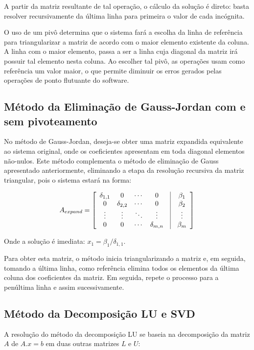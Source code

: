 \documentclass[a4paper,10pt]{report}
\begin{document}
A partir da matriz resultante de tal operação, o cálculo da solução é direto: basta resolver recursivamente da última linha para primeira o valor de cada incógnita.

O uso de um pivô determina que o sistema fará a escolha da linha de referência para triangularizar a matriz de acordo com o maior elemento existente da coluna. A linha com o maior elemento, passa a ser a linha cuja diagonal da matriz irá possuir tal elemento nesta coluna. Ao escolher tal pivô, as operações usam como referência um valor maior, o que permite diminuir os erros gerados pelas operações de ponto flutuante do software.

\subsection{Método da Eliminação de Gauss-Jordan com e sem pivoteamento}

No método de Gauss-Jordan, deseja-se obter uma matriz expandida equivalente ao sistema original, onde os coeficientes apresentam em toda diagonal elementos não-nulos. Este método complementa o método de eliminação de Gauss apresentado anteriormente, eliminando a etapa da resolução recursiva da matriz triangular, pois o sistema estará na forma:

\[
A_{expand} = \left[ \begin{array}{cccccc}
\delta_{1,1} & 0 & \cdots & 0 & \vline & \beta_{1} \\
0 & \delta_{2,2} & \cdots & 0 & \vline & \beta_{2} \\
\vdots  & \vdots & \ddots & \vdots & \vline & \vdots \\
0 & 0 & \cdots & \delta_{m,n} & \vline & \beta_{m} 
\label{arr:triangular}
\end{array}\right]
\]

Onde a solução é imediata: $x_{1} = \beta_{1}/\delta_{1,1}$.

Para obter esta matriz, o método inicia triangularizando a matriz e, em seguida, tomando a última linha, como referência elimina todos os elementos da última coluna dos coeficientes da matriz. Em seguida, repete o processo para a penúltima linha e assim sucessivamente.

\subsection{Método da Decomposição LU e SVD}

A resolução do método da decomposição LU se baseia na decomposição da matriz $A$ de $A.x = b$ em duas outras matrizes $L$ e $U$:
\end{document}
